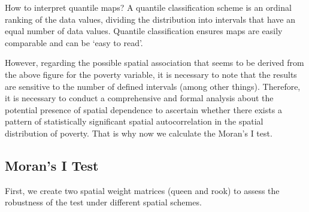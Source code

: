 How to interpret quantile maps? A quantile classification scheme is an ordinal ranking of the data values, dividing the distribution into intervals that have an equal number of data values. Quantile classification ensures maps are easily comparable and can be `easy to read'.

% 
% 


However, regarding the possible spatial association that seems to be derived from the above figure for the poverty variable, it is necessary to note that the results are sensitive to the number of defined intervals (among other things). Therefore, it is necessary to conduct a comprehensive and formal analysis about the potential presence of spatial dependence to ascertain whether there exists a pattern of statistically significant spatial autocorrelation in the spatial distribution of poverty. That is why now we calculate the Moran’s I test.


\subsection{Moran's I Test}

First, we create two spatial weight matrices (queen and rook) to assess the robustness of the test under different spatial schemes. 

\begin{knitrout}
\color{fgcolor}\begin{kframe}
\begin{alltt}
 \hlkwb{<-} \hlstd{(} \hlstd{),}  \hlopt{$}  \hlstd{=}  \hlstd{)}
  \hlkwb{<-} \hlstd{(} \hlstd{),}  \hlopt{$}  \hlstd{=}  \hlstd{)}
\end{alltt}
\end{kframe}
\end{knitrout}

